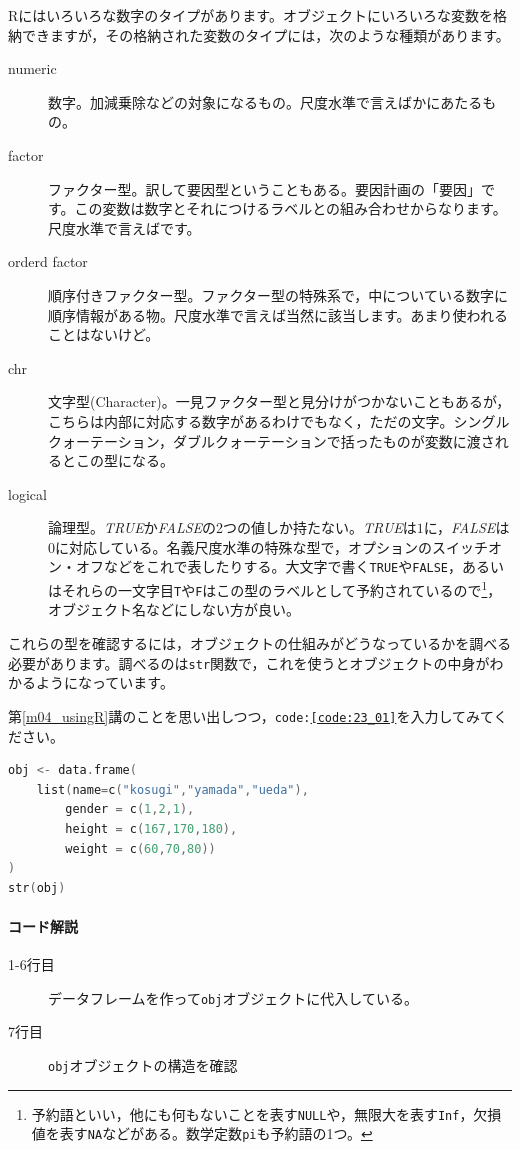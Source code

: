 \documentclass{ltjbook}
\begin{document}
Rにはいろいろな数字のタイプがあります。オブジェクトにいろいろな変数を格納できますが，その格納された変数のタイプには，次のような種類があります。
\begin{description}
	\item[numeric] 数字。加減乗除などの対象になるもの。尺度水準で言えばかにあたるもの。
	\item[factor] ファクター型。訳して要因型ということもある。要因計画の「要因」です。この変数は数字とそれにつけるラベルとの組み合わせからなります。尺度水準で言えばです。
	\item[orderd factor] 順序付きファクター型。ファクター型の特殊系で，中についている数字に順序情報がある物。尺度水準で言えば当然に該当します。あまり使われることはないけど。
	\item[chr] 文字型(Character)。一見ファクター型と見分けがつかないこともあるが，こちらは内部に対応する数字があるわけでもなく，ただの文字。シングルクォーテーション，ダブルクォーテーションで括ったものが変数に渡されるとこの型になる。
	\item[logical] 論理型。\textit{TRUE}か\textit{FALSE}の2つの値しか持たない。\textit{TRUE}は$1$に，\textit{FALSE}は$0$に対応している。名義尺度水準の特殊な型で，オプションのスイッチオン・オフなどをこれで表したりする。大文字で書く\texttt{TRUE}や\texttt{FALSE}，あるいはそれらの一文字目\texttt{T}や\texttt{F}はこの型のラベルとして予約されているので\footnote{予約語といい，他にも何もないことを表す\texttt{NULL}や，無限大を表す\texttt{Inf}，欠損値を表す\texttt{NA}などがある。数学定数\texttt{pi}も予約語の1つ。}，オブジェクト名などにしない方が良い。
\end{description}
これらの型を確認するには，オブジェクトの仕組みがどうなっているかを調べる必要があります。調べるのは\texttt{str}関数で，これを使うとオブジェクトの中身がわかるようになっています。

第\ref{m04_usingR}講のことを思い出しつつ，\texttt{code:\ref{code:23_01}}を入力してみてください。
\begin{lstlisting}[language=c++,label={code:23_01},caption={オブジェクトに代入}]
obj <- data.frame(
    list(name=c("kosugi","yamada","ueda"),
        gender = c(1,2,1),
        height = c(167,170,180),
        weight = c(60,70,80))
)
str(obj)
\end{lstlisting}
\paragraph{コード解説}
\begin{description}
	\item[1-6行目] データフレームを作って\texttt{obj}オブジェクトに代入している。
	\item[7行目] \texttt{obj}オブジェクトの構造を確認
\end{description}
\end{document}
